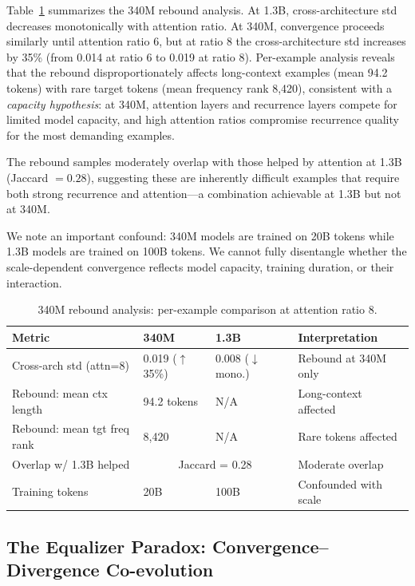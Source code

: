 \documentclass[11pt,a4paper]{article}
\begin{document}
Table~\ref{tab:rebound} summarizes the 340M rebound analysis. At 1.3B, cross-architecture std decreases monotonically with attention ratio. At 340M, convergence proceeds similarly until attention ratio 6, but at ratio 8 the cross-architecture std increases by 35\% (from 0.014 at ratio 6 to 0.019 at ratio 8). Per-example analysis reveals that the rebound disproportionately affects long-context examples (mean 94.2 tokens) with rare target tokens (mean frequency rank 8,420), consistent with a \emph{capacity hypothesis}: at 340M, attention layers and recurrence layers compete for limited model capacity, and high attention ratios compromise recurrence quality for the most demanding examples.

The rebound samples moderately overlap with those helped by attention at 1.3B (Jaccard $= 0.28$), suggesting these are inherently difficult examples that require both strong recurrence and attention---a combination achievable at 1.3B but not at 340M.

We note an important confound: 340M models are trained on 20B tokens while 1.3B models are trained on 100B tokens. We cannot fully disentangle whether the scale-dependent convergence reflects model capacity, training duration, or their interaction.

\begin{table}[t]
\centering
\small
\caption{340M rebound analysis: per-example comparison at attention ratio 8.}
\label{tab:rebound}
\begin{tabular}{@{}llll@{}}
\toprule
Metric & 340M & 1.3B & Interpretation \\
\midrule
Cross-arch std (attn=8) & 0.019 ($\uparrow$35\%) & 0.008 ($\downarrow$ mono.) & Rebound at 340M only \\
Rebound: mean ctx length & 94.2 tokens & N/A & Long-context affected \\
Rebound: mean tgt freq rank & 8,420 & N/A & Rare tokens affected \\
Overlap w/ 1.3B helped & \multicolumn{2}{c}{Jaccard = 0.28} & Moderate overlap \\
Training tokens & 20B & 100B & Confounded with scale \\
\bottomrule
\end{tabular}
\end{table}

\subsection{The Equalizer Paradox: Convergence--Divergence Co-evolution}
\label{sec:paradox}
\end{document}
